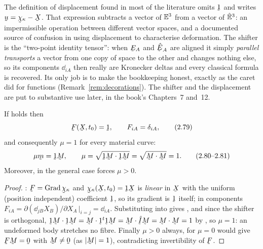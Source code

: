 \begin{remark}\label{rem:shifteruse}
The definition of displacement found in most of the literature omits
$\vek{1}$ and writes $\bu=\bchi_\kappa-\bX$. That expression subtracts a
vector of $\mathbb{E}^{3}$ from a vector of $\hat{\mathbb{E}}^{3}$: an impermissible operation between
different vector spaces, and a documented source of confusion in using
displacement to characterise deformation. The shifter is the ``two-point
identity tensor'': when $\bE_A$ and $\hbE_A$ are aligned it simply
\emph{parallel transports} a vector from one copy of space to the other and
changes nothing else, so its components $\dd_{iA}$ then really are Kronecker
deltas and every classical formula is recovered. Its only job is to make the
bookkeeping honest, exactly as the caret did for functions
(Remark~\ref{rem:decorations}). The shifter and the displacement are put to
substantive use later, in the book's Chapters~7 and~12.
\end{remark}

\begin{proposition}\label{prop:undeformed}
If  holds then
\begin{equation}
   \bF(\bX,t_0)=\vek{1}, \qquad F_{iA}=\dd_{iA}, \tag{2.79}\label{eq:2.79}
\end{equation}
and consequently $\mu=1$ for every material curve:
\begin{equation}
   \mu\bmm=\vek{1}\bM,\qquad
   \mu=\sqrt{\ip{\vek{1}\bM}{\vek{1}\bM}}=\sqrt{\ip\bM\bM}=1. \tag{2.80--2.81}\label{eq:2.80}
\end{equation}
Moreover, in the general case  forces $\mu>0$.
\end{proposition}

\begin{proof}
: $\bF=\Grad\bchi_\kappa$ and $\bchi_\kappa(\bX,t_0)=\vek{1}\bX$ is
\emph{linear} in $\bX$ with the uniform (position independent) coefficient
$\vek{1}$, so its gradient is $\vek{1}$ itself; in components
$F_{iA}=\partial(\dd_{jB}X_B)/\partial X_A\,\big|_{i=j}=\dd_{iA}$.
Substituting into  gives , and since the shifter is
orthogonal, $\ip{\vek{1}\bM}{\vek{1}\bM}
=\ip{\bM}{\vek{1}^{t}\vek{1}\bM}=\ip\bM{\hat\I\bM}=\ip\bM\bM=1$ by
, so $\mu=1$: an undeformed body stretches no fibre.
Finally $\mu>0$ always, for $\mu=0$ would give $\bF\bM=\bze$ with
$\bM\neq\bze$ (as $|\bM|=1$), contradicting invertibility of $\bF$.
\end{proof}

